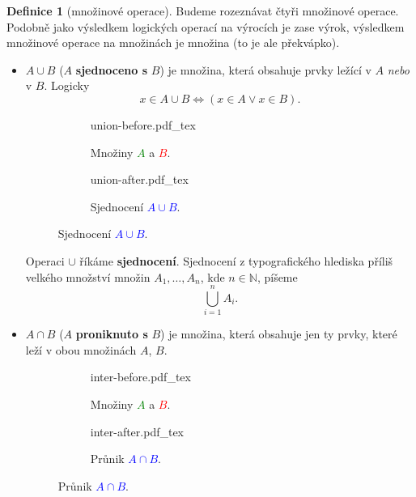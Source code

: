 \documentclass[a4paper,11pt]{article}
\theoremstyle{definition}
\newtheorem{dfn}[thm]{Definice}
\newcommand{\N}{\mathbb{N}}
\begin{document}
\begin{dfn}[množinové operace]
 Budeme rozeznávat čtyři množinové operace. Podobně jako výsledkem logických
 operací na výrocích je zase výrok, výsledkem množinové operace na množinách je
 množina (to je ale překvápko).
 \begin{itemize}
  \item $A \cup B$ ($A$ \textbf{sjednoceno s} $B$) je množina, která obsahuje
   prvky ležící v $A$ \emph{nebo} v $B$. Logicky
   \[
    x \in A \cup B \Leftrightarrow (x \in A \vee x \in B).
   \]
   \begin{center}
    \begin{figure}[h]
     \centering
     \begin{subfigure}{0.45\textwidth}
      \centering
      \def\svgwidth{0.6\textwidth}
      {union-before.pdf_tex}
      \caption*{Množiny \textcolor{green}{$A$} a \textcolor{red}{$B$}.}
     \end{subfigure}
     \begin{subfigure}{0.45\textwidth}
      \centering
      \def\svgwidth{0.6\textwidth}
      {union-after.pdf_tex}
      \caption*{Sjednocení \textcolor{blue}{$A \cup B$}.}
     \end{subfigure}
    \end{figure}
   \end{center}
   \vspace*{-8mm}
   Operaci $ \cup $ říkáme \textbf{sjednocení}. Sjednocení z typografického
   hlediska příliš velkého množství množin $A_1,\ldots,A_n$, kde $n \in \N$,
   píšeme
   \[
    \bigcup_{i=1}^{n} A_i.
   \]
  \item $A \cap B$ ($A$ \textbf{proniknuto s} $B$) je množina, která obsahuje
   jen ty prvky, které leží v obou množinách $A$, $B$.
   \newpage
   \begin{center}
    \begin{figure}[h]
     \centering
     \begin{subfigure}{0.45\textwidth}
      \centering
      \def\svgwidth{0.6\textwidth}
      {inter-before.pdf_tex}
      \caption*{Množiny \textcolor{green}{$A$} a \textcolor{red}{$B$}.}
     \end{subfigure}
     \begin{subfigure}{0.45\textwidth}
      \centering
      \def\svgwidth{0.6\textwidth}
      {inter-after.pdf_tex}
      \caption*{Průnik \textcolor{blue}{$A \cap B$}.}
     \end{subfigure}
    \end{figure}

\end{center}
\end{itemize}
\end{dfn}
\end{document}
